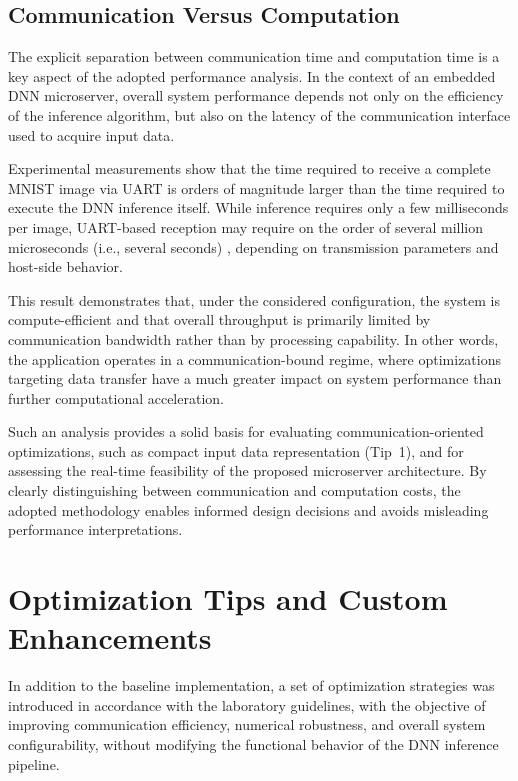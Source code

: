 \section{Communication Versus Computation}

The explicit separation between communication time and computation time is a key
aspect of the adopted performance analysis.
In the context of an embedded DNN microserver, overall system performance depends
not only on the efficiency of the inference algorithm, but also on the latency of
the communication interface used to acquire input data.

Experimental measurements show that the time required to receive a complete MNIST
image via UART is orders of magnitude larger than the time required to execute the
DNN inference itself.
While inference requires only a few milliseconds per image, UART-based reception
may require on the order of several million microseconds (i.e., several seconds)
, depending on transmission parameters and host-side
behavior.

This result demonstrates that, under the considered configuration, the system is
compute-efficient and that overall throughput is primarily limited by
communication bandwidth rather than by processing capability.
In other words, the application operates in a communication-bound regime, where
optimizations targeting data transfer have a much greater impact on system
performance than further computational acceleration.

Such an analysis provides a solid basis for evaluating communication-oriented
optimizations, such as compact input data representation (Tip~1), and for
assessing the real-time feasibility of the proposed microserver architecture.
By clearly distinguishing between communication and computation costs, the
adopted methodology enables informed design decisions and avoids misleading
performance interpretations.



\chapter{Optimization Tips and Custom Enhancements}

In addition to the baseline implementation, a set of optimization strategies was
introduced in accordance with the laboratory guidelines, with the objective of
improving communication efficiency, numerical robustness, and overall system
configurability, without modifying the functional behavior of the DNN inference
pipeline.

